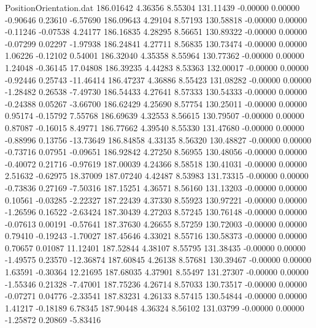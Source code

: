 \begin{filecontents}{PositionOrientation.dat}
 186.01642    4.36356    8.55304   131.11439   -0.00000    0.00000   -0.90646    0.23610   -6.57690
 186.09643    4.29104    8.57193   130.58818   -0.00000    0.00000   -0.11246   -0.07538    4.24177
 186.16835    4.28295    8.56651   130.89322   -0.00000    0.00000   -0.07299    0.02297   -1.97938
 186.24841    4.27711    8.56835   130.73474   -0.00000    0.00000    1.06226   -0.12102    0.54001
 186.32040    4.35358    8.55964   130.77362   -0.00000    0.00000    1.24048   -0.36145   17.04808
 186.39235    4.44283    8.53363   132.00017   -0.00000    0.00000   -0.92446    0.25743  -11.46414
 186.47237    4.36886    8.55423   131.08282   -0.00000    0.00000   -1.28482    0.26538   -7.49730
 186.54433    4.27641    8.57333   130.54333   -0.00000    0.00000   -0.24388    0.05267   -3.66700
 186.62429    4.25690    8.57754   130.25011   -0.00000    0.00000    0.95174   -0.15792    7.55768
 186.69639    4.32553    8.56615   130.79507   -0.00000    0.00000    0.87087   -0.16015    8.49771
 186.77662    4.39540    8.55330   131.47680   -0.00000    0.00000   -0.88996    0.13756  -13.73649
 186.84858    4.33135    8.56320   130.48827   -0.00000    0.00000   -0.73716    0.07951   -0.09651
 186.92842    4.27250    8.56955   130.48056   -0.00000    0.00000   -0.40072    0.21716   -0.97619
 187.00039    4.24366    8.58518   130.41031   -0.00000    0.00000    2.51632   -0.62975   18.37009
 187.07240    4.42487    8.53983   131.73315   -0.00000    0.00000   -0.73836    0.27169   -7.50316
 187.15251    4.36571    8.56160   131.13203   -0.00000    0.00000    0.10561   -0.03285   -2.22327
 187.22439    4.37330    8.55923   130.97221   -0.00000    0.00000   -1.26596    0.16522   -2.63424
 187.30439    4.27203    8.57245   130.76148   -0.00000    0.00000   -0.07613    0.00191   -0.57641
 187.37630    4.26655    8.57259   130.72003   -0.00000    0.00000    0.79410   -0.19243   -1.70027
 187.45646    4.33021    8.55716   130.58373   -0.00000    0.00000    0.70657    0.01087   11.12401
 187.52844    4.38107    8.55795   131.38435   -0.00000    0.00000   -1.49575    0.23570  -12.36874
 187.60845    4.26138    8.57681   130.39467   -0.00000    0.00000    1.63591   -0.30364   12.21695
 187.68035    4.37901    8.55497   131.27307   -0.00000    0.00000   -1.55346    0.21328   -7.47001
 187.75236    4.26714    8.57033   130.73517   -0.00000    0.00000   -0.07271    0.04776   -2.33541
 187.83231    4.26133    8.57415   130.54844   -0.00000    0.00000    1.41217   -0.18189    6.78345
 187.90448    4.36324    8.56102   131.03799   -0.00000    0.00000   -1.25872    0.20869   -5.83416

\end{filecontents}
